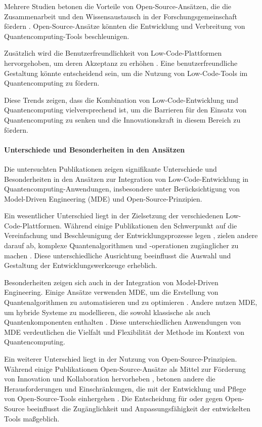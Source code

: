 Mehrere Studien betonen die Vorteile von Open-Source-Ansätzen, die die Zusammenarbeit und den Wissensaustausch 
in der Forschungsgemeinschaft fördern \cite{Amato_2023, Gemeinhardt_2023}. Open-Source-Ansätze könnten die 
Entwicklung und Verbreitung von Quantencomputing-Tools beschleunigen.

Zusätzlich wird die Benutzerfreundlichkeit von Low-Code-Plattformen hervorgehoben, um deren Akzeptanz zu erhöhen \cite{Pinho_2022, Prinz_2021}. 
Eine benutzerfreundliche Gestaltung könnte entscheidend sein, um die Nutzung von Low-Code-Tools im Quantencomputing zu fördern.

Diese Trends zeigen, dass die Kombination von Low-Code-Entwicklung und Quantencomputing vielversprechend ist, um die 
Barrieren für den Einsatz von Quantencomputing zu senken und die Innovationskraft in diesem Bereich zu fördern.

\paragraph{Unterschiede und Besonderheiten in den Ansätzen}

Die untersuchten Publikationen zeigen signifikante Unterschiede und Besonderheiten in den Ansätzen 
zur Integration von Low-Code-Entwicklung in Quantencomputing-Anwendungen, insbesondere unter Berücksichtigung 
von Model-Driven Engineering (MDE) und Open-Source-Prinzipien.

Ein wesentlicher Unterschied liegt in der Zielsetzung der verschiedenen Low-Code-Plattformen. 
Während einige Publikationen den Schwerpunkt auf die Vereinfachung und Beschleunigung der 
Entwicklungsprozesse legen \cite{Sahay_2020, Khorram_2020}, zielen andere darauf ab, komplexe 
Quantenalgorithmen und -operationen zugänglicher zu machen \cite{Gemeinhardt_2021, Gemeinhardt_2023}. 
Diese unterschiedliche Ausrichtung beeinflusst die Auswahl und Gestaltung der Entwicklungswerkzeuge erheblich.

Besonderheiten zeigen sich auch in der Integration von Model-Driven Engineering. Einige Ansätze 
verwenden MDE, um die Erstellung von Quantenalgorithmen zu automatisieren und zu optimieren \cite{Moin_2021, Perez-Castillo_2022}. 
Andere nutzen MDE, um hybride Systeme zu modellieren, die sowohl klassische als auch Quantenkomponenten 
enthalten \cite{Weder_2020, Polat_2024}. Diese unterschiedlichen Anwendungen von MDE verdeutlichen die Vielfalt 
und Flexibilität der Methode im Kontext von Quantencomputing.

Ein weiterer Unterschied liegt in der Nutzung von Open-Source-Prinzipien. Während einige Publikationen Open-Source-Ansätze 
als Mittel zur Förderung von Innovation und Kollaboration hervorheben \cite{Amato_2023, Ahmad_2023}, betonen andere die 
Herausforderungen und Einschränkungen, die mit der Entwicklung und Pflege von Open-Source-Tools einhergehen \cite{Sanchez_2021}. 
Die Entscheidung für oder gegen Open-Source beeinflusst die Zugänglichkeit und Anpassungsfähigkeit der entwickelten Tools maßgeblich.

